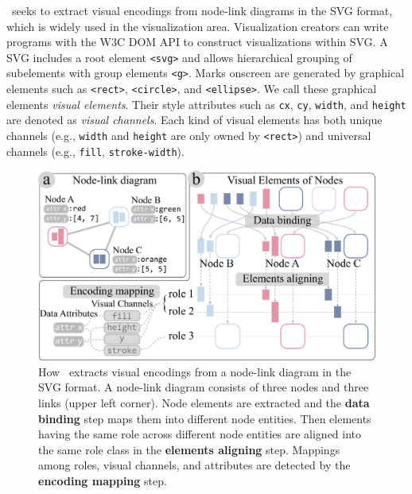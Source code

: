 \ApproachName~seeks to extract visual encodings from node-link diagrams in the SVG format, which is widely used in the visualization area.
Visualization creators can write programs with the W3C DOM API to construct visualizations within SVG.
A SVG includes a root element \texttt{<svg>} and allows hierarchical grouping of subelements with group elements \texttt{<g>}.
Marks onscreen are generated by graphical elements such as \texttt{<rect>}, \texttt{<circle>}, and \texttt{<ellipse>}.
We call these graphical elements \textit{visual elements}.
Their style attributes such as \texttt{cx}, \texttt{cy}, \texttt{width}, and \texttt{height} are denoted as \textit{visual channels}.
Each kind of visual elements has both unique channels (e.g., \texttt{width} and \texttt{height} are only owned by \texttt{<rect>}) and universal channels (e.g., \texttt{fill}, \texttt{stroke-width}).

\begin{figure}[ht]
    \centering
    \includegraphics[width=1\columnwidth]{figures/VisualEncodings.eps}
    \caption{How \ApproachName~extracts visual encodings from a node-link diagram in the SVG format. A node-link diagram consists of three nodes and three links (upper left corner). Node elements are extracted and the \textbf {data binding} step maps them into different node entities. Then elements having the same role across different node entities are aligned into the same role class in the \textbf{elements aligning} step. Mappings among roles, visual channels, and attributes are detected by the \textbf{encoding mapping} step.}
    \label{fig:VisualEncodings}
\end{figure}

